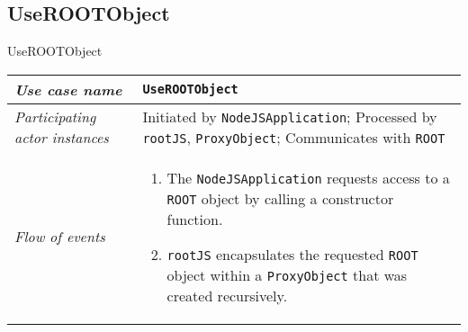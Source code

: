 \subsection{UseROOTObject}
\begin{frame}{UseROOTObject}
        \begin{longtable}{p{3cm} @{\hskip 1cm} p{7cm}}
                \hline

                \textit{Use case name} & \texttt{UseROOTObject}\\
                \hline

                \textit{Participating actor instances} &
                Initiated by \texttt{NodeJSApplication}; Processed by \texttt{rootJS}, \texttt{ProxyObject}; Communicates with \texttt{ROOT}\\
                \hline

                \textit{Flow of events} &
                        \begin{enumerate}
                                \pause

                                \item The \texttt{NodeJSApplication} requests access to a \texttt{ROOT} object by calling a constructor function.
                                \pause

                                \item \texttt{rootJS} encapsulates the requested \texttt{ROOT} object within a \texttt{ProxyObject} that was created recursively.
                        \end{enumerate}
                        \\
        \end{longtable}
\end{frame}
